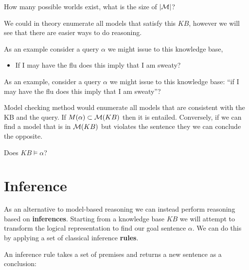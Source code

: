\documentclass[11pt]{article}
\begin{document}
\begin{exercise}
  How many possible worlds exist, what is the size of $|\mathcal{M}|$? 
\end{exercise}




\noindent We could in theory enumerate all models that satisfy this $KB$, however we will see that there are easier ways to do reasoning. 

As an example consider a query $\alpha$ we might issue to this knowledge base, 

\begin{itemize}
\item If I may have the flu does this imply that I am sweaty?
\end{itemize}



As an example, consider a query  $\alpha$ we might issue to this knowledge base: ``if I may have the flu does this imply that I am sweaty''?  


Model checking method would enumerate all
models that are consistent with the KB and the query. If $M(\alpha)
\subset \mathcal{M}(KB)$ then it is entailed. Conversely, if we can find a model that is in $\mathcal{M}(KB)$ but violates
the sentence they we can conclude the opposite. 


\begin{exercise}
  Does $KB \models \alpha$?
\end{exercise}


\section{Inference}

As an alternative to model-based reasoning we can instead perform
reasoning based on \textbf{inferences}.  Starting from a knowledge
base $KB$ we will attempt to transform the logical representation to
find our goal sentence $\alpha$. We can do this by applying a set of 
classical inference \textbf{rules}.


An inference rule takes a set of premises and returns a new sentence as a conclusion:
\end{document}
